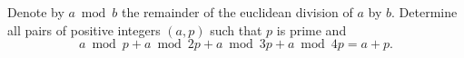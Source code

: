 Denote by $a \bmod b$ the remainder of the euclidean division of $a$ by $b$. Determine all pairs of positive integers $(a,p)$ such that $p$ is prime and \[ a \bmod p + a\bmod 2p + a\bmod 3p + a\bmod 4p = a + p. \]